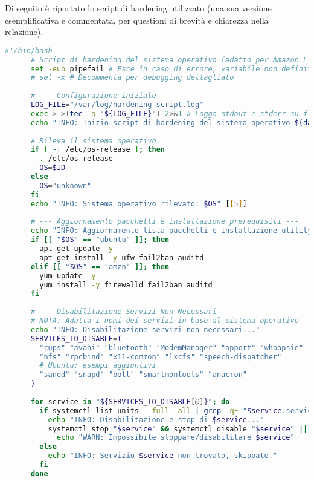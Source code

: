     Di seguito è riportato lo script di hardening utilizzato (una sua versione esemplificativa e commentata, per questioni di brevità e chiarezza nella relazione).
    \begin{lstlisting}[language=Bash, caption={Script di Hardening del Sistema Operativo (hardening\_script.sh)}, label={lst:hardening_script}]
      #!/bin/bash
      # Script di hardening del sistema operativo (adatto per Amazon Linux 2 e Ubuntu 20.04)
      set -euo pipefail # Esce in caso di errore, variabile non definita o errore in una pipe
      # set -x # Decommenta per debugging dettagliato
      
      # --- Configurazione iniziale ---
      LOG_FILE="/var/log/hardening-script.log"
      exec > >(tee -a "${LOG_FILE}") 2>&1 # Logga stdout e stderr su file e console
      echo "INFO: Inizio script di hardening del sistema operativo $(date)"
      
      # Rileva il sistema operativo
      if [ -f /etc/os-release ]; then
        . /etc/os-release
        OS=$ID
      else
        OS="unknown"
      fi
      echo "INFO: Sistema operativo rilevato: $OS" [[5]]
      
      # --- Aggiornamento pacchetti e installazione prerequisiti ---
      echo "INFO: Aggiornamento lista pacchetti e installazione utility base..."
      if [[ "$OS" == "ubuntu" ]]; then
        apt-get update -y
        apt-get install -y ufw fail2ban auditd
      elif [[ "$OS" == "amzn" ]]; then
        yum update -y
        yum install -y firewalld fail2ban auditd
      fi
      
      # --- Disabilitazione Servizi Non Necessari ---
      # NOTA: Adatta i nomi dei servizi in base al sistema operativo
      echo "INFO: Disabilitazione servizi non necessari..."
      SERVICES_TO_DISABLE=(
        "cups" "avahi" "bluetooth" "ModemManager" "apport" "whoopsie"
        "nfs" "rpcbind" "x11-common" "lxcfs" "speech-dispatcher"
        # Ubuntu: esempi aggiuntivi
        "saned" "snapd" "bolt" "smartmontools" "anacron"
      )
      
      for service in "${SERVICES_TO_DISABLE[@]}"; do
        if systemctl list-units --full -all | grep -qF "$service.service"; then
          echo "INFO: Disabilitazione e stop di $service..."
          systemctl stop "$service" && systemctl disable "$service" || \
            echo "WARN: Impossibile stoppare/disabilitare $service"
        else
          echo "INFO: Servizio $service non trovato, skippato."
        fi
      done
      

\end{lstlisting}
